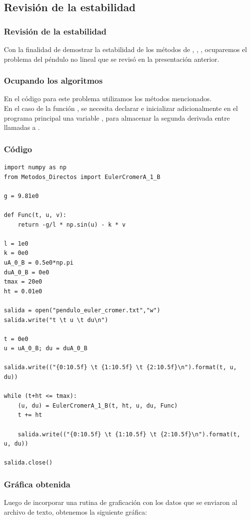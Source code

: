 \subsection*{Revisión de la estabilidad}
\begin{frame}
\frametitle{Revisión de la estabilidad}
Con la finalidad de demostrar la estabilidad de los métodos de , , , ocuparemos el problema del péndulo no lineal que se revisó en la presentación anterior.
\end{frame}
\begin{frame}
\frametitle{Ocupando los algoritmos}
En el código para este problema utilizamos los métodos mencionados.
\\
\bigskip
En el caso de la función , se necesita declarar e inicializar adicionalmente en el programa principal una variable , para almacenar la segunda derivada entre llamadas a .
\end{frame}
\begin{frame}
\frametitle{Código}
\begin{lstlisting}[caption=Código para el método Euler-Cromer, style=codigopython]
import numpy as np
from Metodos_Directos import EulerCromerA_1_B

g = 9.81e0

def Func(t, u, v):
    return -g/l * np.sin(u) - k * v

l = 1e0
k = 0e0
uA_0_B = 0.5e0*np.pi
duA_0_B = 0e0
tmax = 20e0
ht = 0.01e0

salida = open("pendulo_euler_cromer.txt","w")
salida.write("t \t u \t du\n")

t = 0e0
u = uA_0_B; du = duA_0_B

salida.write(("{0:10.5f} \t {1:10.5f} \t {2:10.5f}\n").format(t, u, du))

while (t+ht <= tmax):
    (u, du) = EulerCromerA_1_B(t, ht, u, du, Func)
    t += ht

    salida.write(("{0:10.5f} \t {1:10.5f} \t {2:10.5f}\n").format(t, u, du))

salida.close()
\end{lstlisting}
\end{frame}
\begin{frame}
\frametitle{Gráfica obtenida}
Luego de incorporar una rutina de graficación con los datos que se enviaron al archivo de texto, obtenemos la siguiente gráfica:
\end{frame}
